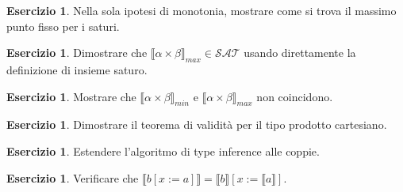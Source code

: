 \documentclass[oneside]{amsart}
\numberwithin{equation}{section}
\numberwithin{figure}{section}
\theoremstyle{plain}
\theoremstyle{definition}
\newtheorem{xca}[thm]{Esercizio}
\begin{document}
\begin{xca}
Nella sola ipotesi di monotonia, mostrare come si trova il massimo
punto fisso per i saturi.
\end{xca}

\begin{xca}
Dimostrare che $\llbracket\alpha\times\beta\rrbracket_{max} \in \mathcal{SAT}$
usando direttamente la definizione di insieme saturo.
\end{xca}

\begin{xca}
Mostrare che $\llbracket\alpha\times\beta\rrbracket_{min}$ e
$\llbracket\alpha\times\beta\rrbracket_{max}$ non coincidono.
\end{xca}

\begin{xca}
Dimostrare il teorema di validità per il tipo prodotto cartesiano.
\end{xca}

\begin{xca}
Estendere l'algoritmo di type inference alle coppie.
\end{xca}

\begin{xca}
Verificare che $\llbracket b[x:=a] \rrbracket = \llbracket b\rrbracket[x:=\llbracket a\rrbracket]$.
\end{xca}
\end{document}
